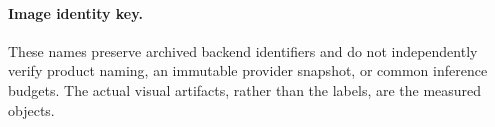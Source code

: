 \begin{table}[t]
\centering\small
\setlength{\tabcolsep}{5pt}

\caption{Every image pair. Entries are first-source wins / ties /
second-source wins / Not sure. Each row describes the same pair under three
different questions; these are not independent respondent samples.}
\label{tab:human-image-detail}
\end{table}

\paragraph{Image identity key.}

These names preserve archived backend identifiers and do not independently
verify product naming, an immutable provider snapshot, or common inference
budgets. The actual visual artifacts, rather than the labels, are the measured
objects.


